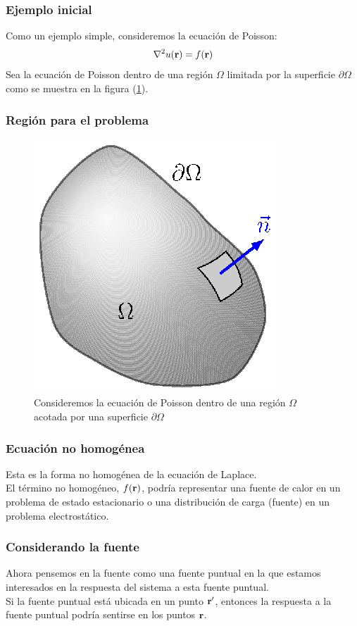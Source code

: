 \documentclass[12pt]{beamer}
\begin{document}
\begin{frame}
\frametitle{Ejemplo inicial}
Como un ejemplo simple, consideremos la ecuación de Poisson:
\pause
\begin{align*}
\laplacian{u} (\vb{r}) = f (\vb{r})
\end{align*}
Sea la ecuación de Poisson dentro de una región $\Omega$ limitada por la superficie $\partial \Omega$ como se muestra en la figura (\ref{fig:figura_07_01}).
\end{frame}

\begin{frame}
\frametitle{Región para el problema}
\begin{figure}[H]
\centering
\includegraphics[scale=1]{Imagenes/Funcion_Green_01.eps}
\caption{Consideremos la ecuación de Poisson dentro de una región $\Omega$ acotada por una superficie $\partial \Omega$}
\label{fig:figura_07_01}
\end{figure}
\end{frame}

\begin{frame}
\frametitle{Ecuación no homogénea}
Esta es la forma no homogénea de la ecuación de Laplace.
\\
\bigskip
\pause
El término no homogéneo, $f (\vb{r})$, podría representar una fuente de calor en un problema de estado estacionario o una distribución de carga (fuente) en un problema electrostático.
\end{frame}

\begin{frame}
\frametitle{Considerando la fuente}
Ahora pensemos en la fuente como una fuente puntual en la que estamos interesados en la respuesta del sistema a esta fuente puntual.
\\
\bigskip
\pause
Si la fuente puntual está ubicada en un punto $\vb{\ensuremath{{r}^{\prime}}}$, entonces la respuesta a la fuente puntual podría sentirse en los puntos $\vb{r}$.
\end{frame}
\end{document}
